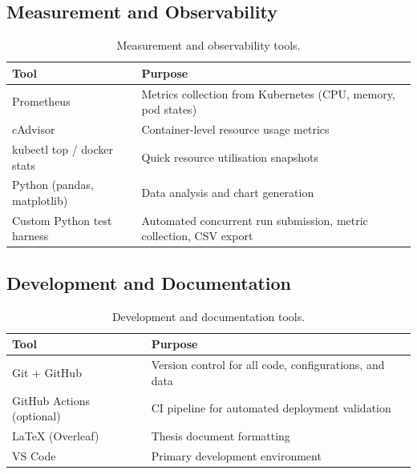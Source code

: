 \subsection{Measurement and Observability}
\label{subsec:measurement-tools}

\begin{table}[H]
  \centering
  \caption{Measurement and observability tools.}
  \label{tab:measurement-tools}
  \small
  \begin{tabularx}{\textwidth}{lX}
    \toprule
    \textbf{Tool} & \textbf{Purpose} \\
    \midrule
    Prometheus                  & Metrics collection from Kubernetes (CPU, memory, pod states) \\
    cAdvisor                    & Container-level resource usage metrics \\
    kubectl top / docker stats  & Quick resource utilisation snapshots \\
    Python (pandas, matplotlib) & Data analysis and chart generation \\
    Custom Python test harness  & Automated concurrent run submission, metric collection, CSV export \\
    \bottomrule
  \end{tabularx}
\end{table}

\subsection{Development and Documentation}
\label{subsec:dev-tools}

\begin{table}[H]
  \centering
  \caption{Development and documentation tools.}
  \label{tab:dev-tools}
  \small
  \begin{tabularx}{\textwidth}{lX}
    \toprule
    \textbf{Tool} & \textbf{Purpose} \\
    \midrule
    Git + GitHub              & Version control for all code, configurations, and data \\
    GitHub Actions (optional) & CI pipeline for automated deployment validation \\
    \LaTeX{} (Overleaf)       & Thesis document formatting \\
    VS Code                   & Primary development environment \\
    \bottomrule
  \end{tabularx}
\end{table}

